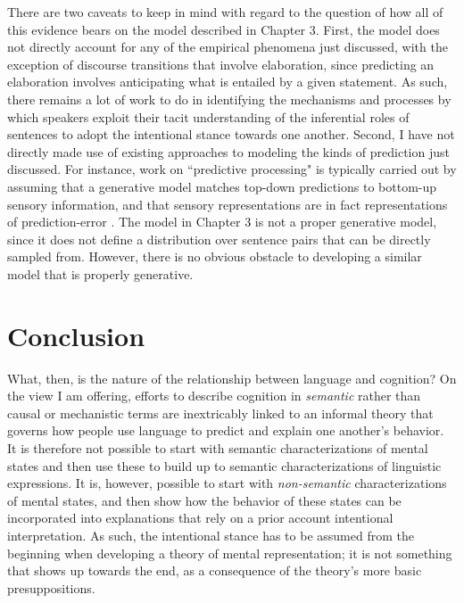 There are two caveats to keep in mind with regard to the question of how all of this evidence bears on the model described in Chapter 3. First, the model does not directly account for any of the empirical phenomena just discussed, with the exception of discourse transitions that involve elaboration, since predicting an elaboration involves anticipating what is entailed by a given statement. As such, there remains a lot of work to do in identifying the mechanisms and processes by which speakers exploit their tacit understanding of the inferential roles of sentences to adopt the intentional stance towards one another. Second, I have not directly made use of existing approaches to modeling the kinds of prediction just discussed. For instance, work on ``predictive processing" is typically carried out by assuming that a generative model matches top-down predictions to bottom-up sensory information, and that sensory representations are in fact representations of prediction-error \citep{clark:2013}. The model in Chapter 3 is not a proper generative model, since it does not define a distribution over sentence pairs that can be directly sampled from. However, there is no obvious obstacle to developing a similar model that is properly generative. 

\section{Conclusion}

What, then, is the nature of the relationship between language and cognition? On the view I am offering, efforts to describe cognition in \textit{semantic} rather than causal or mechanistic terms are inextricably linked to an informal theory that governs how people use language to predict and explain one another's behavior. It is therefore not possible to start with semantic characterizations of mental states and then use these to build up to semantic characterizations of linguistic expressions. It is, however, possible to start with \textit{non-semantic} characterizations of mental states, and then show how the behavior of these states can be incorporated into explanations that rely on a prior account intentional interpretation. As such, the intentional stance has to be assumed from the beginning when developing a theory of mental representation; it is not something that shows up towards the end, as a consequence of the theory's more basic presuppositions. 

